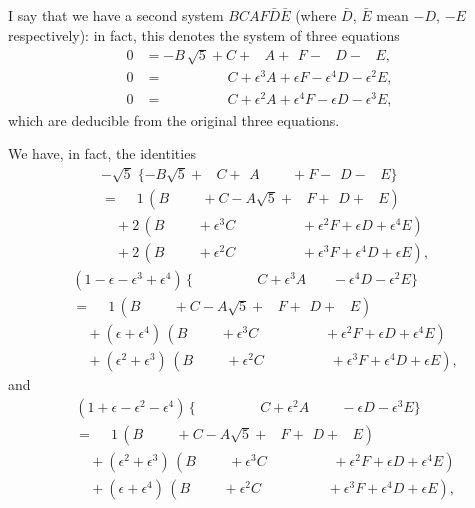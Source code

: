\documentclass[12pt,a4paper]{article}
\theoremstyle{definition}
\begin{document}
I say that we have a second system $BCAF\bar{D}\bar{E}$ (where $\bar{D}$, $\bar{E}$ mean $-D$, $-E$
respectively): in fact, this denotes the system of three equations
\begin{align*}
0 &= -B\,\sqrt{5} + C + \phantom{\epsilon^3}A + \phantom{\epsilon}F - \phantom{\epsilon^4}D - \phantom{\epsilon^2}E,\\
0 &= \phantom{-B\sqrt{5} +}\; C + \epsilon^3 A + \epsilon F - \epsilon^4 D - \epsilon^2 E,\\
0 &= \phantom{-B\sqrt{5} +}\; C + \epsilon^2 A + \epsilon^4 F - \epsilon D - \epsilon^3 E,
\end{align*}
which are deducible from the original three equations.

We have, in fact, the identities
\begin{align*}
&- \sqrt{5}\; \{-B\sqrt{5} + \phantom{\epsilon^3}C + \phantom{\epsilon}A \phantom{+ \epsilon^4 F} + F - \phantom{\epsilon}D - \phantom{\epsilon^2}E\} \\
&= \phantom{+} 1\,(B \phantom{+ \epsilon^3 C} + C - A\sqrt{5} + \phantom{\epsilon^4}F + \phantom{\epsilon}D + \phantom{\epsilon^2}E) \\
&\quad + 2\,(B \phantom{+ \epsilon^3 C} + \epsilon^3 C \phantom{+ \epsilon F + \epsilon^4 D} + \epsilon^2 F + \epsilon D + \epsilon^4 E) \\
&\quad + 2\,(B \phantom{+ \epsilon^3 C} + \epsilon^2 C \phantom{+ \epsilon^4 F + \epsilon D} + \epsilon^3 F + \epsilon^4 D + \epsilon E),
\end{align*}
\begin{align*}
&(1 - \epsilon - \epsilon^3 + \epsilon^4)\, \{\phantom{-B\sqrt{5} +}\; C + \epsilon^3 A \phantom{+ \epsilon F} - \epsilon^4 D - \epsilon^2 E\} \\
&= \phantom{+} 1\,(B \phantom{+ \epsilon^3 C} + C - A\sqrt{5} + \phantom{\epsilon^4}F + \phantom{\epsilon}D + \phantom{\epsilon^2}E) \\
&\quad + (\epsilon + \epsilon^4)\,(B \phantom{+ \epsilon^3 C} + \epsilon^3 C \phantom{+ \epsilon F + \epsilon^4 D} + \epsilon^2 F + \epsilon D + \epsilon^4 E) \\
&\quad + (\epsilon^2 + \epsilon^3)\,(B \phantom{+ \epsilon^3 C} + \epsilon^2 C \phantom{+ \epsilon^4 F + \epsilon D} + \epsilon^3 F + \epsilon^4 D + \epsilon E),
\end{align*}
and
\begin{align*}
&(1 + \epsilon - \epsilon^2 - \epsilon^4)\, \{\phantom{-B\sqrt{5} +}\; C + \epsilon^2 A \phantom{+ \epsilon^4 F} - \epsilon D - \epsilon^3 E\} \\
&= \phantom{+} 1\,(B \phantom{+ \epsilon^3 C} + C - A\sqrt{5} + \phantom{\epsilon^4}F + \phantom{\epsilon}D + \phantom{\epsilon^2}E) \\
&\quad + (\epsilon^2 + \epsilon^3)\,(B \phantom{+ \epsilon^3 C} + \epsilon^3 C \phantom{+ \epsilon F + \epsilon^4 D} + \epsilon^2 F + \epsilon D + \epsilon^4 E) \\
&\quad + (\epsilon + \epsilon^4)\,(B \phantom{+ \epsilon^3 C} + \epsilon^2 C \phantom{+ \epsilon^4 F + \epsilon D} + \epsilon^3 F + \epsilon^4 D + \epsilon E),
\end{align*}
\end{document}
